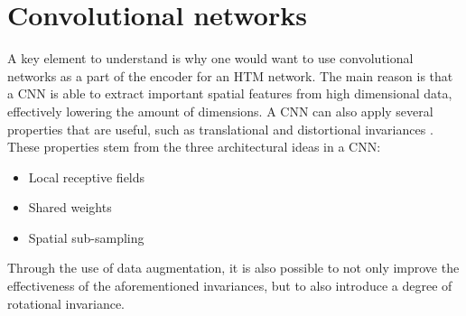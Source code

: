\section{Convolutional networks}
A key element to understand is why one would want to use convolutional networks as a part of the encoder for an HTM network. The main reason is that a CNN is able to extract important spatial features from high dimensional data, effectively lowering the amount of dimensions. A CNN can also apply several properties that are useful, such as translational and distortional invariances \cite{cnn_invariance}. These properties stem from the three architectural ideas in a CNN:
\begin{itemize}
    \item Local receptive fields
    \item Shared weights
    \item Spatial sub-sampling
\end{itemize}
Through the use of data augmentation, it is also possible to not only improve the effectiveness of the aforementioned invariances, but to also introduce a degree of rotational invariance.
